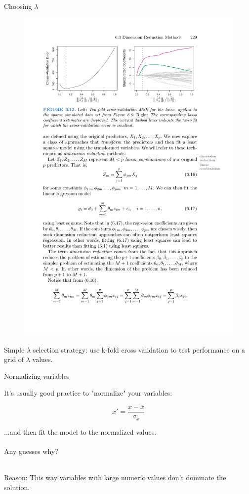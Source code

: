 \documentclass[mathserif]{beamer}
\begin{document}
\begin{frame}{Choosing $\lambda$}
\begin{figure}
\includegraphics[scale=.7]{lasso-tenfold}
\end{figure}

\pause

Simple $\lambda$ selection strategy: use k-fold cross validation to test performance on a grid of $\lambda$ values. 


\end{frame}

\begin{frame}{Normalizing variables}

It's usually good practice to "normalize" your variables:

\begin{equation}
x' = \frac{x - \bar{x}}{\sigma_x}
\end{equation}

...and then fit the model to the normalized values.  \\~\\

Any guesses why?\\~\\

\pause

Reason: This way variables with large numeric values don't dominate the solution.  

\end{frame}
\end{document}
